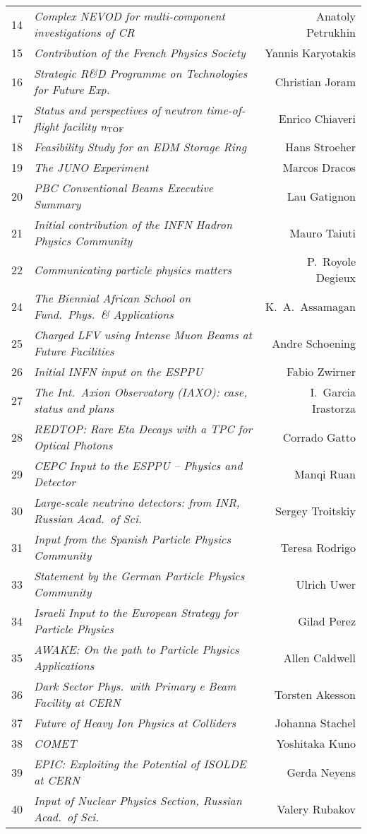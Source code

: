\begin{flushleft}
\begin{tabular}{llr}
14 & \it Complex NEVOD for multi-component investigations of CR & Anatoly Petrukhin \\
15 & \it Contribution of the French Physics Society & Yannis Karyotakis \\
16 & \it Strategic R\&D Programme on Technologies for Future Exp. & Christian Joram \\
17 & \it Status and perspectives of neutron time-of-flight facility n$_{\rm TOF}$ & Enrico Chiaveri \\
18 & \it Feasibility Study for an EDM Storage Ring & Hans Stroeher \\
19 & \it The JUNO Experiment & Marcos Dracos \\
20 & \it PBC Conventional Beams Executive Summary & Lau Gatignon \\
21 & \it Initial contribution of the INFN Hadron Physics Community& Mauro Taiuti \\
22 & \it Communicating particle physics matters & P.\ Royole Degieux \\
24 & \it The Biennial African School on Fund.\ Phys.\ \& Applications & K.\ A.\ Assamagan \\
25 & \it Charged LFV using Intense Muon Beams at Future Facilities & Andre Schoening \\
26 & \it Initial INFN input on the ESPPU & Fabio Zwirner \\
27 & \it The Int.\ Axion Observatory (IAXO): case, status and plans & I.\ Garcia Irastorza \\
28 & \it REDTOP: Rare Eta Decays with a TPC for Optical Photons & Corrado Gatto \\
29 & \it CEPC Input to the ESPPU -- Physics and Detector & Manqi Ruan \\
30 & \it Large-scale neutrino detectors: from INR, Russian Acad.\ of Sci. & Sergey Troitskiy \\
31 & \it Input from the Spanish Particle Physics Community & Teresa Rodrigo \\
33 & \it Statement by the German Particle Physics Community & Ulrich Uwer \\
34 & \it Israeli Input to the European Strategy for Particle Physics & Gilad Perez \\
35 & \it AWAKE: On the path to Particle Physics Applications & Allen Caldwell \\
36 & \it Dark Sector Phys.\ with Primary e Beam Facility at CERN & Torsten Akesson \\
37 & \it Future of Heavy Ion Physics at Colliders & Johanna Stachel \\
38 & \it COMET& Yoshitaka Kuno \\
39 & \it EPIC: Exploiting the Potential of ISOLDE at CERN & Gerda Neyens \\
40 & \it Input of Nuclear Physics Section, Russian Acad.\ of Sci. & Valery Rubakov \\
\end{tabular}
\end{flushleft}
